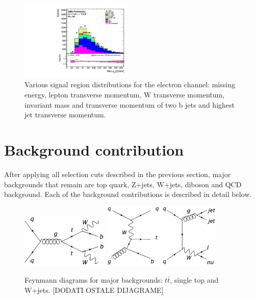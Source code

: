 \begin{figure}[htbp]
		\includegraphics[width=0.48\textwidth]{Figures/Results/Electron/prefit/Wbb_max_hJet_pt_doQCD1.pdf}		
	\caption[Signal region distributions for the electron channel]{Various signal region distributions for the electron channel: missing energy, lepton transverse momentum, W transverse momentum, invariant mass and transverse momentum of two b jets and highest jet transverse momentum. }
	\label{fig:Wbb_prefit_electron}
\end{figure}


\section{Background contribution}
\label{sec:background}
After applying all selection cuts described in the previous section, major backgrounds that remain are top quark, Z+jets, W+jets, diboson and QCD background. Each of the background contributions is described in detail below. 

\begin{figure}[htbp]
	\centering
		\includegraphics[width=0.37\textwidth]{Figures/FD-tt.png}
		\includegraphics[width=0.245\textwidth]{Figures/FD-st.png}
		\includegraphics[width=0.25\textwidth]{Figures/FD-WJ.png}
	\caption[Feynmann diagrams showing major backgrounds]{Feynmann diagrams for major backgrounds: $t\bar{t}$, single top and W+jets. [DODATI OSTALE DIJAGRAME]}
	\label{fig:backgrounds}
\end{figure}

